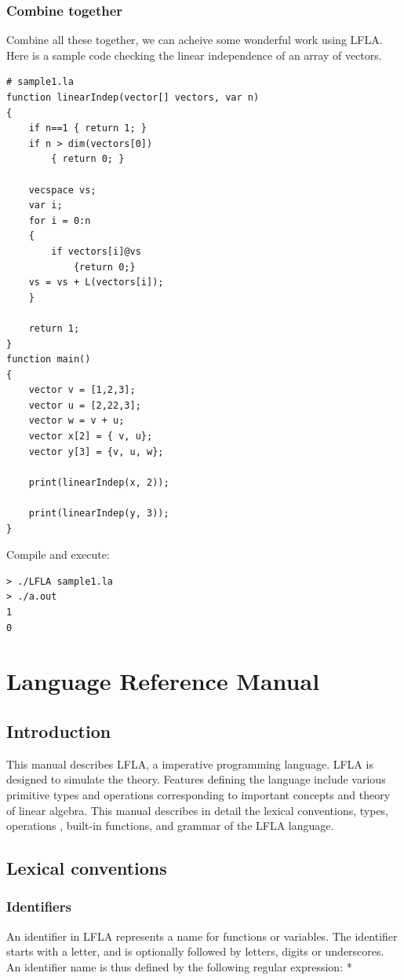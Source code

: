 \documentclass[12pt]{article} %
\begin{document}
\subsubsection{Combine together} 
\noindent Combine all these together, we can acheive some wonderful work using LFLA. Here is a sample code checking the linear independence of an array of vectors.
\begin{lstlisting} 
# sample1.la
function linearIndep(vector[] vectors, var n)
{
	if n==1 { return 1; }
	if n > dim(vectors[0])
		{ return 0; }

	vecspace vs;
	var i;
	for i = 0:n
	{
		if vectors[i]@vs
			{return 0;}
	vs = vs + L(vectors[i]);
	}

	return 1;
}
function main()
{
	vector v = [1,2,3];
	vector u = [2,22,3];
	vector w = v + u;
	vector x[2] = { v, u};
	vector y[3] = {v, u, w};

	print(linearIndep(x, 2));

	print(linearIndep(y, 3));
}
\end{lstlisting}
Compile and execute:
\begin{lstlisting} 
> ./LFLA sample1.la
> ./a.out
1
0
\end{lstlisting}
\section{Language Reference Manual}
\subsection{Introduction}
This manual describes LFLA, a imperative programming language.  LFLA is
designed to  simulate the theory. Features defining the language
include  various primitive types and operations  corresponding to important concepts and theory  of  linear algebra. This manual
describes in detail the lexical conventions, types,  operations , built-in functions, and grammar of the LFLA
language.


\subsection{Lexical conventions}

\subsubsection{Identifiers}
An identifier in LFLA represents a name for functions or variables. The identifier starts with a letter, and is optionally followed by letters, digits or underscores. An identifier name is thus defined
by the following regular expression:  
  \newline
['a' - 'z' 'A' -'Z' ] ['a' - 'z' 'A' - 'Z' '0' - '9' '\_']*
\end{document}
